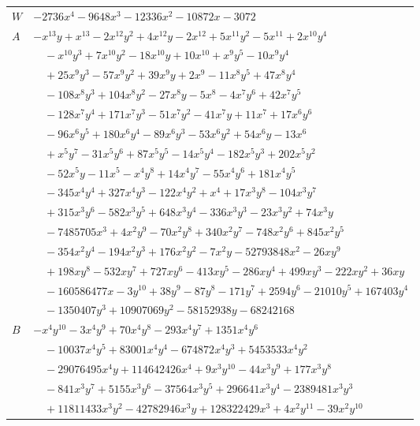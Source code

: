 \documentclass[11pt]{article}
\begin{document}
\begin{longtable}{@{}ll@{}}
$W$ & $-2736x^{4}-9648x^{3}-12336x^{2}-10872x-3072$\\
$A$ & $-x^{13}y+x^{13}-2x^{12}y^{2}+4x^{12}y-2x^{12}+5x^{11}y^{2}-5x^{11}+2x^{10}y^{4}$\\
 & $\quad -x^{10}y^{3}+7x^{10}y^{2}-18x^{10}y+10x^{10}+x^{9}y^{5}-10x^{9}y^{4}$\\
 & $\quad +25x^{9}y^{3}-57x^{9}y^{2}+39x^{9}y+2x^{9}-11x^{8}y^{5}+47x^{8}y^{4}$\\
 & $\quad -108x^{8}y^{3}+104x^{8}y^{2}-27x^{8}y-5x^{8}-4x^{7}y^{6}+42x^{7}y^{5}$\\
 & $\quad -128x^{7}y^{4}+171x^{7}y^{3}-51x^{7}y^{2}-41x^{7}y+11x^{7}+17x^{6}y^{6}$\\
 & $\quad -96x^{6}y^{5}+180x^{6}y^{4}-89x^{6}y^{3}-53x^{6}y^{2}+54x^{6}y-13x^{6}$\\
 & $\quad +x^{5}y^{7}-31x^{5}y^{6}+87x^{5}y^{5}-14x^{5}y^{4}-182x^{5}y^{3}+202x^{5}y^{2}$\\
 & $\quad -52x^{5}y-11x^{5}-x^{4}y^{8}+14x^{4}y^{7}-55x^{4}y^{6}+181x^{4}y^{5}$\\
 & $\quad -345x^{4}y^{4}+327x^{4}y^{3}-122x^{4}y^{2}+x^{4}+17x^{3}y^{8}-104x^{3}y^{7}$\\
 & $\quad +315x^{3}y^{6}-582x^{3}y^{5}+648x^{3}y^{4}-336x^{3}y^{3}-23x^{3}y^{2}+74x^{3}y$\\
 & $\quad -7485705x^{3}+4x^{2}y^{9}-70x^{2}y^{8}+340x^{2}y^{7}-748x^{2}y^{6}+845x^{2}y^{5}$\\
 & $\quad -354x^{2}y^{4}-194x^{2}y^{3}+176x^{2}y^{2}-7x^{2}y-52793848x^{2}-26xy^{9}$\\
 & $\quad +198xy^{8}-532xy^{7}+727xy^{6}-413xy^{5}-286xy^{4}+499xy^{3}-222xy^{2}+36xy$\\
 & $\quad -160586477x-3y^{10}+38y^{9}-87y^{8}-171y^{7}+2594y^{6}-21010y^{5}+167403y^{4}$\\
 & $\quad -1350407y^{3}+10907069y^{2}-58152938y-68242168$\\
$B$ & $-x^{4}y^{10}-3x^{4}y^{9}+70x^{4}y^{8}-293x^{4}y^{7}+1351x^{4}y^{6}$\\
 & $\quad -10037x^{4}y^{5}+83001x^{4}y^{4}-674872x^{4}y^{3}+5453533x^{4}y^{2}$\\
 & $\quad -29076495x^{4}y+114642426x^{4}+9x^{3}y^{10}-44x^{3}y^{9}+177x^{3}y^{8}$\\
 & $\quad -841x^{3}y^{7}+5155x^{3}y^{6}-37564x^{3}y^{5}+296641x^{3}y^{4}-2389481x^{3}y^{3}$\\
 & $\quad +11811433x^{3}y^{2}-42782946x^{3}y+128322429x^{3}+4x^{2}y^{11}-39x^{2}y^{10}$\\

\end{longtable}
\end{document}
